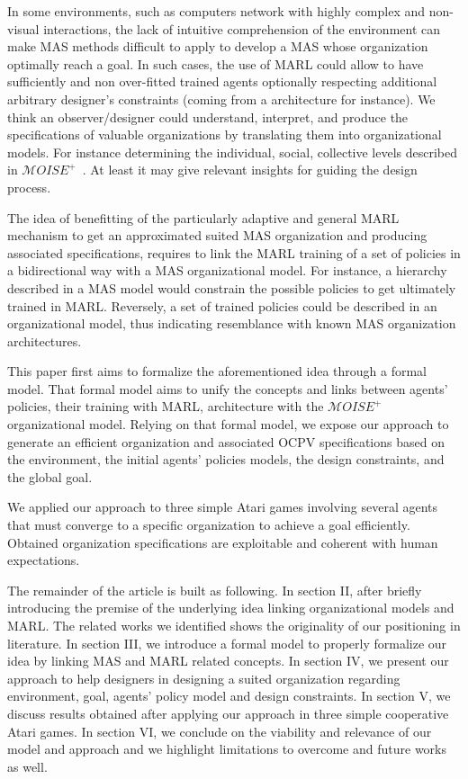 \documentclass[runningheads]{llncs}
\begin{document}
In some environments, such as computers network with highly complex and non-visual interactions, the lack of intuitive comprehension of the environment can make MAS methods difficult to apply to develop a MAS whose organization optimally reach a goal. In such cases, the use of MARL could allow to have sufficiently and non over-fitted trained agents optionally respecting additional arbitrary designer's constraints (coming from a architecture for instance). We think an observer/designer could understand, interpret, and produce the specifications of valuable organizations by translating them into organizational models. For instance determining the individual, social, collective levels described in $\mathcal{M}OISE^{+}$~\cite{Hubner2002}. At least it may give relevant insights for guiding the design process.

The idea of benefitting of the particularly adaptive and general MARL mechanism to get an approximated suited MAS organization and producing associated specifications, requires to link the MARL training of a set of policies in a bidirectional way with a MAS organizational model. For instance, a hierarchy described in a MAS model would constrain the possible policies to get ultimately trained in MARL. Reversely, a set of trained policies could be described in an organizational model, thus indicating resemblance with known MAS organization architectures.

This paper first aims to formalize the aforementioned idea through a formal model. That formal model aims to unify the concepts and links between agents' policies, their training with MARL, architecture with the $\mathcal{M}OISE^{+}$ organizational model. Relying on that formal model, we expose our approach to generate an efficient organization and associated OCPV specifications based on the environment, the initial agents' policies models, the design constraints, and the global goal.

We applied our approach to three simple Atari games involving several agents that must converge to a specific organization to achieve a goal efficiently. Obtained organization specifications are exploitable and coherent with human expectations.

The remainder of the article is built as following.
In section II, after briefly introducing the premise of the underlying idea linking organizational models and MARL. The related works we identified shows the originality of our positioning in literature.
In section III, we introduce a formal model to properly formalize our idea by linking MAS and MARL related concepts.
In section IV, we present our approach to help designers in designing a suited organization regarding environment, goal, agents' policy model and design constraints.
In section V, we discuss results obtained after applying our approach in three simple cooperative Atari games.
In section VI, we conclude on the viability and relevance of our model and approach and we highlight limitations to overcome and future works as well.
\end{document}
